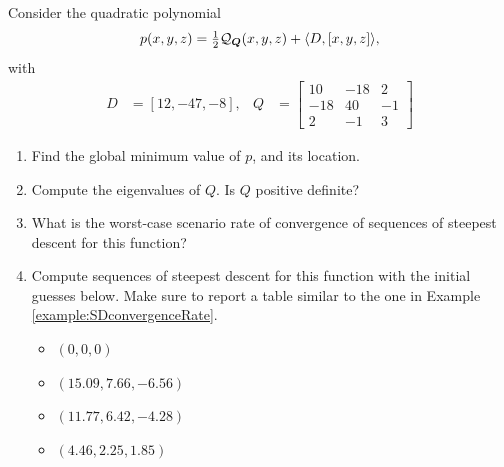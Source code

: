 \begin{problem}\cite[lec5\_steep\_desce, 8.4]{Freund2004nonlinear}
Consider the quadratic polynomial 
\begin{equation*}
p(x,y,z) = \tfrac{1}{2} \mathcal{Q}_{\boldsymbol{Q}}(x,y,z) + \langle D, [x,y,z] \rangle,
\end{equation*}
with
\begin{align*}
D &= [12, -47, -8], & Q &= \begin{bmatrix} 10 & -18 & 2 \\ -18 & 40 & -1 \\ 2 & -1 & 3 \end{bmatrix}
\end{align*}
\begin{enumerate}
	\item Find the global minimum value of $p$, and its location.
	\item Compute the eigenvalues of $Q$.  Is $Q$ positive definite?
	\item What is the worst-case scenario rate of convergence of sequences of steepest descent for this function?
	\item Compute sequences of steepest descent for this function with the initial guesses below.  Make sure to report a table similar to the one in Example \ref{example:SDconvergenceRate}.
	\begin{itemize}
		\item $(0,0,0)$
		\item $(15.09, 7.66, -6.56)$
		\item $(11.77, 6.42, -4.28)$
		\item $(4.46, 2.25, 1.85)$
	\end{itemize}
\end{enumerate}
\end{problem}

